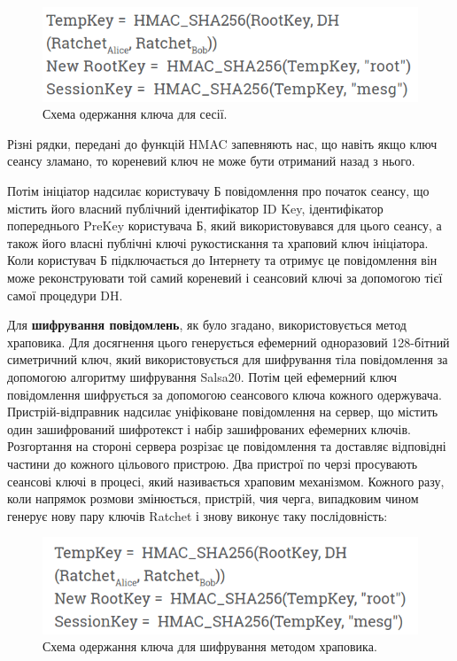 \begin{figure}[ht!]
        \centering
        \includegraphics[scale=0.37]{../IMAGES/viber_2_session_key.png}
        \caption{Схема одержання ключа для сесії.}
        \label{viber_2_session_key}
\end{figure}

Різні рядки, передані до функцій HMAC запевняють нас, що навіть якщо ключ сеансу зламано, то кореневий ключ не може бути отриманий назад з нього.

Потім ініціатор надсилає користувачу Б повідомлення про початок сеансу, що містить його власний публічний ідентифікатор ID Key, ідентифікатор попереднього PreKey користувача Б, який використовувався для цього сеансу, а також його власні публічні ключі рукостискання та храповий ключ ініціатора. Коли користувач Б підключається до Інтернету та отримує це повідомлення він може реконструювати той самий кореневий і сеансовий ключі за допомогою тієї самої процедури DH.

Для \textbf{шифрування повідомлень}, як було згадано, використовується метод храповика. Для досягнення цього генерується ефемерний одноразовий 128-бітний симетричний ключ, який використовується для шифрування тіла повідомлення за допомогою алгоритму шифрування Salsa20. Потім цей ефемерний ключ повідомлення шифрується за допомогою сеансового ключа кожного одержувача. Пристрій-відправник надсилає уніфіковане повідомлення на сервер, що містить один зашифрований шифротекст і набір зашифрованих ефемерних ключів. Розгортання на стороні сервера розрізає це повідомлення та доставляє відповідні частини до кожного цільового пристрою. Два пристрої по черзі просувають сеансові ключі в процесі, який називається храповим механізмом. Кожного разу, коли напрямок розмови змінюється, пристрій, чия черга, випадковим чином генерує нову пару ключів Ratchet і знову виконує таку послідовність:

\begin{figure}[ht!]
        \centering
        \includegraphics[scale=0.37]{../IMAGES/viber_3_msg_exchange.png}
        \caption{Схема одержання ключа для шифрування методом храповика.}
        \label{viber_3_msg_exchange}
\end{figure}


